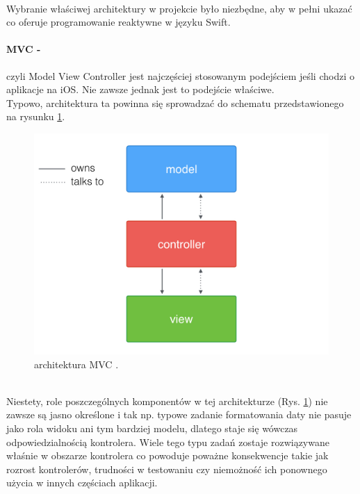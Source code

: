 \documentclass[12pt,oneside,a4paper]{report}
\begin{document}
\paragraph{}Wybranie właściwej architektury w projekcie było niezbędne, aby w pełni ukazać co oferuje programowanie reaktywne w języku Swift. 
\paragraph{MVC -}czyli Model View Controller jest najczęściej stosowanym podejściem jeśli chodzi o aplikacje na iOS. Nie zawsze jednak jest to podejście właściwe. \\
Typowo, architektura ta powinna się sprowadzać do schematu przedstawionego na rysunku \ref{MVC}.
	\begin{figure}[ht!]
	\centering
	\includegraphics[width=13cm]{MVC}
	\caption{architektura MVC \cite{MVC}.}
	\label{MVC}
\end{figure}\\
Niestety, role poszczególnych komponentów w tej architekturze (Rys. \ref{MVC}) nie zawsze są jasno określone i tak np. typowe zadanie formatowania daty nie pasuje jako rola widoku ani tym bardziej modelu, dlatego staje się wówczas odpowiedzialnością kontrolera. Wiele tego typu zadań zostaje rozwiązywane właśnie w obszarze kontrolera co powoduje poważne konsekwencje takie jak rozrost kontrolerów, trudności w testowaniu czy niemożność ich ponownego użycia w innych częściach aplikacji.
\end{document}
